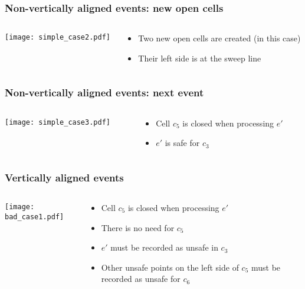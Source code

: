\documentclass[compress]{beamer}
\begin{document}
\begin{frame}
\frametitle{Non-vertically aligned events: new open cells}
\begin{columns}
\begin{column}{0.3\textwidth}
{\texttt{[image: simple\_case2.pdf]}}
\end{column}
\begin{column}{0.7\textwidth}
\begin{itemize}
\item Two new open cells are created (in this case)
\item Their left side is at the sweep line
\end{itemize}
\end{column}
\end{columns}
\end{frame}
\begin{frame}
\frametitle{Non-vertically aligned events: next event}
\begin{columns}
\begin{column}{0.3\textwidth}
{\texttt{[image: simple\_case3.pdf]}}
\end{column}
\begin{column}{0.7\textwidth}
\begin{itemize}
\item Cell \(c_5\) is closed when processing \(e'\)
\item \(e'\) is safe for \(c_3\)
\end{itemize}
\end{column}
\end{columns}
\end{frame}
\begin{frame}
\frametitle{Vertically aligned events}
\begin{columns}
\begin{column}{0.3\textwidth}
{\texttt{[image: bad\_case1.pdf]}}
\end{column}
\begin{column}{0.7\textwidth}
\begin{itemize}
\item Cell \(c_5\) is closed when processing \(e'\)
\item There is no need for \(c_5\)
\item \(e'\) must be recorded as unsafe in \(c_3\)
\item Other unsafe points on the left side of \(c_5\) must be recorded as unsafe for \(c_6\)
\end{itemize}
\end{column}
\end{columns}
\end{frame}
\end{document}

